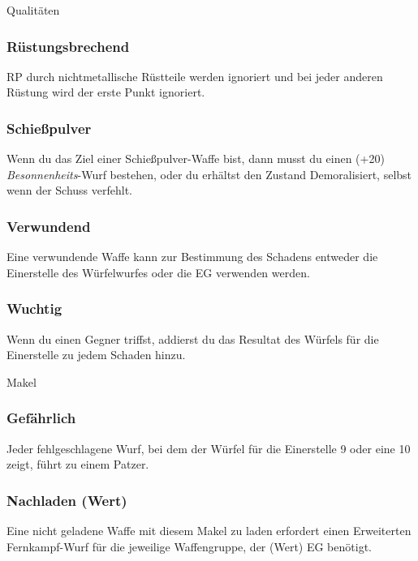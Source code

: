 \documentclass{article}
\begin{document}
\begin{multicols*}{3}
\begin{slsframe}{Qualitäten}
        \subsubsection*{Rüstungsbrechend}
        RP durch nichtmetallische Rüstteile werden ignoriert und bei jeder anderen Rüstung wird der erste Punkt ignoriert.

        \subsubsection*{Schießpulver}
        Wenn du das Ziel einer Schießpulver-Waffe bist, dann musst du einen (+20) \textit{Besonnenheits}-Wurf bestehen, oder du erhältst den Zustand Demoralisiert, selbst wenn der Schuss verfehlt.

        \subsubsection*{Verwundend}
        Eine verwundende Waffe kann zur Bestimmung des Schadens entweder die Einerstelle des Würfelwurfes oder die EG verwenden werden.
        
        \subsubsection*{Wuchtig}
        Wenn du einen Gegner triffst, addierst du das Resultat des Würfels für die Einerstelle zu jedem Schaden hinzu.

    \end{slsframe}

    \begin{slsframe}{Makel}
        \subsubsection*{Gefährlich}
        Jeder fehlgeschlagene Wurf, bei dem der Würfel für die Einerstelle 9 oder eine 10 zeigt, führt zu einem Patzer.

        \subsubsection*{Nachladen (Wert)}
        Eine nicht geladene Waffe mit diesem Makel zu laden erfordert einen Erweiterten Fernkampf-Wurf für die jeweilige Waffengruppe, der (Wert) EG benötigt.

    \end{slsframe}




\end{multicols*}
\end{document}
